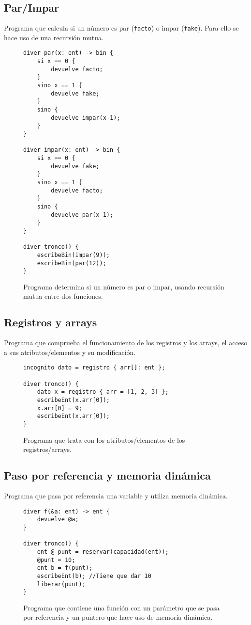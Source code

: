 \subsection{Par/Impar}
Programa que calcula si un número es par (\lstinline{facto}) o impar
(\lstinline{fake}). Para ello se hace uso de una recursión mutua.
\begin{figure}[htbp]
    \centering
    \begin{lstlisting}
diver par(x: ent) -> bin {
    si x == 0 {
        devuelve facto;
    }
    sino x == 1 {
        devuelve fake;
    }
    sino {
        devuelve impar(x-1);
    }
}

diver impar(x: ent) -> bin {
    si x == 0 {
        devuelve fake;
    }
    sino x == 1 {
        devuelve facto;
    }
    sino {
        devuelve par(x-1);
    }
}

diver tronco() {
    escribeBin(impar(9));
    escribeBin(par(12));
}
    \end{lstlisting}
    \caption{Programa determina si un número es par o impar, usando recursión
    mutua entre dos funciones.}
\end{figure}

\subsection{Registros y arrays}
Programa que comprueba el funcionamiento de los registros y los arrays, el
acceso a sus atributos/elementos y su modificación.
\begin{figure}[htbp]
    \centering
    \begin{lstlisting}
incognito dato = registro { arr[]: ent };

diver tronco() {
    dato x = registro { arr = [1, 2, 3] };
    escribeEnt(x.arr[0]);
    x.arr[0] = 9;
    escribeEnt(x.arr[0]);
}
    \end{lstlisting}
    \caption{Programa que trata con los atributos/elementos de los
    registros/arrays.}
\end{figure}

\subsection{Paso por referencia y memoria dinámica}
Programa que pasa por referencia una variable y utiliza memoria dinámica.
\begin{figure}[htbp]
    \centering
    \begin{lstlisting}
diver f(&a: ent) -> ent {
    devuelve @a;
}

diver tronco() {
    ent @ punt = reservar(capacidad(ent));
    @punt = 10;
    ent b = f(punt);
    escribeEnt(b); //Tiene que dar 10
    liberar(punt);
}
    \end{lstlisting}
    \caption{Programa que contiene una función con un parámetro que se pasa por
    referencia y un puntero que hace uso de memoria dinámica.}
\end{figure}
